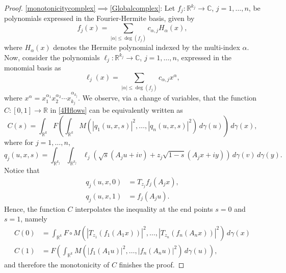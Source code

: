 \documentclass[10pt,a4paper]{amsart}
\newcommand{\R}{\mathbb{R}}
\begin{document}
\begin{proof}
\eqref{monotonicitycomplex}$\implies$\eqref{Globalcomplex}:	Let $f_j: \mathbb{R}^{k_j} \to \mathbb{C}$, $j = 1, \ldots, n$, be polynomials expressed in the Fourier-Hermite basis, given by  
\begin{equation*}
	f_j(x) = \sum_{|\alpha| \leq \deg(f_j)} c_{\alpha,j} H_\alpha(x),
\end{equation*}
where $H_\alpha(x)$ denotes the Hermite polynomial indexed by the multi-index $\alpha$.  Now, consider the polynomials $\ell_j: \mathbb{R}^{k_j} \to \mathbb{C}$, $j = 1, \ldots, n$, expressed in the monomial basis as  
\begin{equation*}
	\ell_j(x) = \sum_{|\alpha| \leq \deg(f_j)} c_{\alpha,j} x^\alpha,
\end{equation*}
where $x^\alpha = x_1^{\alpha_1} x_2^{\alpha_2} \cdots x_{k_j}^{\alpha_{k_j}}$.
We observe, via a change of variables, that the function $C:[0,1]\to\R$ in \eqref{4Hflows} can be equivalently written as
\begin{equation*}
	C(s)=\int_{\R^k}F\left(\int_{\R^k}M(|q_1(u,x,s)|^2,\ldots,|q_n(u,x,s)|^2)\,d\gamma(u)\right)\,d\gamma(x),
\end{equation*}
where for $j=1,\ldots,n$,
\begin{equation*}
	q_j(u,x,s)=\int_{\R^{k_j}}\int_{\R^{k_j}}\ell_j(\sqrt{s}(A_j u+iv)+z_j\sqrt{1-s}(A_j x+iy))\,d\gamma(v)\,d\gamma(y).
\end{equation*}
Notice that
\begin{align*}
	q_j(u,x,0)&=T_{z_j}f_j(A_j x),\\
	q_j(u,x,1)&=f_j(A_j u).
\end{align*}
Hence, the function $C$ interpolates the inequality at the end points $s=0$ and $s=1$, namely
\begin{align*}
	C(0)&=	\int_{\R^k}F\circ M(|T_{z_1}(f_1(A_1 x))|^2, \ldots, |T_{z_n}(f_n( A_n x))|^2) \,d\gamma(x)\\
	C(1)&=F\left(	\int_{\R^k}M(|f_1(A_1 u)|^2, \ldots, |f_n(A_n u)|^2)\,d\gamma(u)\right),
\end{align*}
and therefore the monotonicity of $C$ finishes the proof.

	\end{proof}
\end{document}
